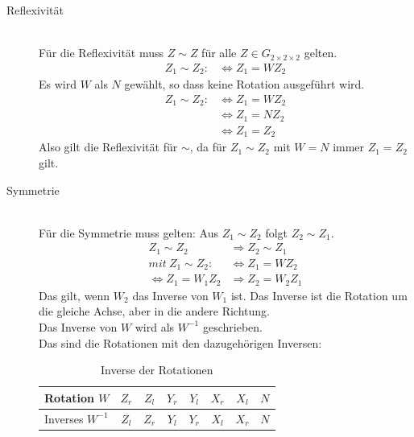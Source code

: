 \documentclass[12pt,a4paper, usenames, dvipsnames]{article}
\newcommand{\Gtwo}{\ensuremath{G_{2\times 2\times 2}}}
\begin{document}
\begin{description}



\item [Reflexivität] \ \\
Für die Reflexivität muss $Z \sim Z$ für alle $Z \in \Gtwo$ gelten. 
\begin{align*}
Z_1 \sim Z_2 : & \Leftrightarrow  Z_1 = WZ_2
\end{align*}
Es wird $W$ als $N$ gewählt, so dass keine Rotation ausgeführt wird.
\begin{align*}
Z_1 \sim Z_2 : & \Leftrightarrow  Z_1 = WZ_2 \\
\ & \Leftrightarrow Z_1=N Z_2 \\
\ & \Leftrightarrow Z_1 = Z_2
\end{align*}
Also gilt die Reflexivität für $\sim$, da für $Z_1 \sim Z_2$ mit $W=N$ immer $Z_1 = Z_2$ gilt.

\item [Symmetrie] \ \\
Für die Symmetrie muss gelten: Aus $Z_1 \sim Z_2$ folgt $Z_2 \sim Z_1$.
\begin{align*}
Z_1 \sim Z_2 & \Rightarrow Z_2 \sim Z_1 \\
mit \ Z_1 \sim Z_2 : & \Leftrightarrow  Z_1 = WZ_2 \\
\Leftrightarrow Z_1 = W_1 Z_2 & \Rightarrow Z_2 = W_2 Z_1
\end{align*}
Das gilt, wenn $W_2$ das Inverse von $W_1$ ist. Das Inverse ist die Rotation um die gleiche Achse, aber in die andere Richtung. \\
Das Inverse von $W$ wird als $W^{-1}$ geschrieben. \\

Das sind die Rotationen mit den dazugehörigen Inversen: \\

\begin{table}[H]
\centering
\begin{tabular}{lccccccc}
Rotation $W$ & ${Z_r}$ & ${Z_l}$ &  ${Y_r}$ & ${Y_l}$ & ${X_r}$ & ${X_l}$ & $N$ \\
\hline
Inverses \hspace*{0.1em} $W^{-1}$ & ${Z_l}$ & ${Z_r}$ &  ${Y_l}$ & ${Y_r}$ & ${X_l}$ & ${X_r}$ & $N$ \\

\end{tabular} 
\caption[Inverse der Rotationen]{Inverse der Rotationen}
\end{table}


\end{description}
\end{document}
